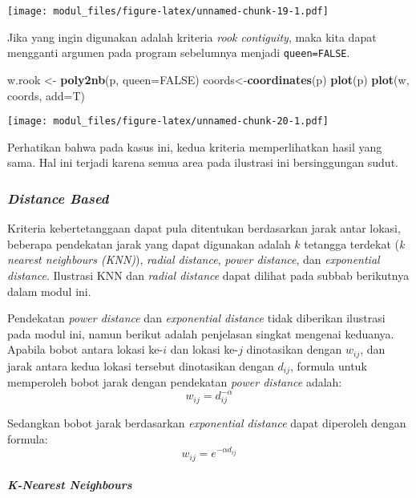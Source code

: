 \documentclass[
]{book}
\newenvironment{Shaded}{\begin{snugshade}}{\end{snugshade}}
\newcommand{\DataTypeTok}[1]{\textcolor[rgb]{0.13,0.29,0.53}{#1}}
\newcommand{\KeywordTok}[1]{\textcolor[rgb]{0.13,0.29,0.53}{\textbf{#1}}}
\newcommand{\NormalTok}[1]{#1}
\newcommand{\OtherTok}[1]{\textcolor[rgb]{0.56,0.35,0.01}{#1}}
\newcommand{\StringTok}[1]{\textcolor[rgb]{0.31,0.60,0.02}{#1}}
\begin{document}
\texttt{[image: modul\_files/figure-latex/unnamed-chunk-19-1.pdf]}

Jika yang ingin digunakan adalah kriteria \emph{rook contiguity}, maka kita dapat mengganti argumen pada program sebelumnya menjadi \texttt{queen=FALSE}.

\begin{Shaded}
\begin{Highlighting}[]
\NormalTok{w.rook \textless{}{-}}\StringTok{ }\KeywordTok{poly2nb}\NormalTok{(p, }\DataTypeTok{queen=}\OtherTok{FALSE}\NormalTok{)}
\NormalTok{coords\textless{}{-}}\KeywordTok{coordinates}\NormalTok{(p)}
\KeywordTok{plot}\NormalTok{(p)}
\KeywordTok{plot}\NormalTok{(w, coords, }\DataTypeTok{add=}\NormalTok{T)}
\end{Highlighting}
\end{Shaded}

\texttt{[image: modul\_files/figure-latex/unnamed-chunk-20-1.pdf]}

Perhatikan bahwa pada kasus ini, kedua kriteria memperlihatkan hasil yang sama. Hal ini terjadi karena semua area pada ilustrasi ini bersinggungan sudut.

\hypertarget{distance-based}{%
\subsubsection{\texorpdfstring{\emph{Distance Based}}{Distance Based}}\label{distance-based}}

Kriteria kebertetanggaan dapat pula ditentukan berdasarkan jarak antar lokasi, beberapa pendekatan jarak yang dapat digunakan adalah \(k\) tetangga terdekat (\emph{k nearest neighbours (KNN)}), \emph{radial distance}, \emph{power distance}, dan \emph{exponential distance}. Ilustrasi KNN dan \emph{radial distance} dapat dilihat pada subbab berikutnya dalam modul ini.

Pendekatan \emph{power distance} dan \emph{exponential distance} tidak diberikan ilustrasi pada modul ini, namun berikut adalah penjelasan singkat mengenai keduanya. Apabila bobot antara lokasi ke-\(i\) dan lokasi ke-\(j\) dinotasikan dengan \(w_{ij}\), dan jarak antara kedua lokasi tersebut dinotasikan dengan \(d_{ij}\), formula untuk memperoleh bobot jarak dengan pendekatan \emph{power distance} adalah:
\[
w_{ij}=d_{ij}^{-\alpha}
\]

Sedangkan bobot jarak berdasarkan \emph{exponential distance} dapat diperoleh dengan formula:
\[
w_{ij}=e^{{-\alpha}d_{ij}}
\]

\hypertarget{k-nearest-neighbours}{%
\paragraph{\texorpdfstring{\emph{K-Nearest Neighbours}}{K-Nearest Neighbours}}\label{k-nearest-neighbours}}
\end{document}
